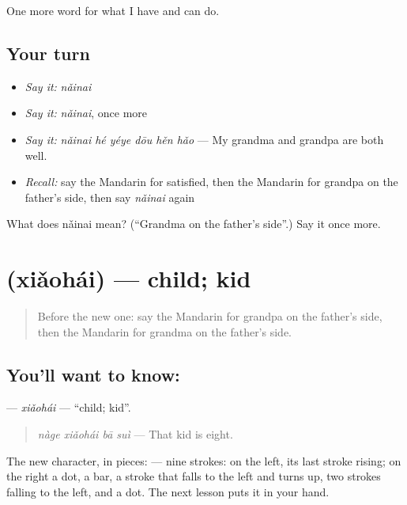 \begin{grammarlens}[title={What you've built}]
One more word for what I have and can do.
\end{grammarlens}

\subsection*{Your turn}
\begin{itemize}
\raggedright
  \item \emph{Say it:} \emph{nǎinai}
  \item \emph{Say it:} \emph{nǎinai}, once more
  \item \emph{Say it:} \emph{nǎinai hé yéye dōu hěn hǎo} — My grandma and grandpa are both well.
  \item \emph{Recall:} say the Mandarin for satisfied, then the Mandarin for grandpa on the father's side, then say \emph{nǎinai} again
\end{itemize}

\begin{tcolorbox}[breakable,colback=teal!4,colframe=teal!35!black,title={Before you move on}]
What does nǎinai mean? (\textquotedblleft{}Grandma on the father's side\textquotedblright{}.) Say it once more.
\end{tcolorbox}
\section[\texorpdfstring{\zh{小孩} (xiǎohái)}{小孩 (xiǎohái)}]{ (xiǎohái) — child; kid}

\label{lesson:ZH-C253-xiaohai}



\begin{quote}
Before the new one: say the Mandarin for grandpa on the father's side, then the Mandarin for grandma on the father's side.
\end{quote}

\subsection*{You'll want to know: }
\textbf{} — \emph{xiǎohái} — \textquotedblleft{}child; kid\textquotedblright{}.

\begin{quote}
\textbf{} \emph{nàge xiǎohái bā suì} — That kid is eight.
\end{quote}

The new character, in pieces:  — nine strokes:  on the left, its last stroke rising; on the right a dot, a bar, a stroke that falls to the left and turns up, two strokes falling to the left, and a dot. The next lesson puts it in your hand.

